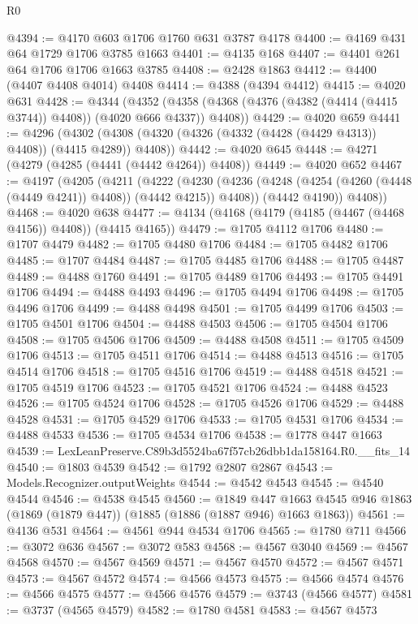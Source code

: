\begin{lexlean}{R0}
\begin{coremodule}
@4394 := @4170 @603 @1706 @1760 @631 @3787 @4178
@4400 := @4169 @431 @64 @1729 @1706 @3785 @1663
@4401 := @4135 @168
@4407 := @4401 @261 @64 @1706 @1706 @1663 @3785
@4408 := @2428 @1863
@4412 := @4400 (@4407 @4408 @4014) @4408
@4414 := @4388 (@4394 @4412)
@4415 := @4020 @631
@4428 := @4344
    (@4352 (@4358 (@4368 (@4376 (@4382 (@4414 (@4415 @3744)) @4408)) (@4020 @666 @4337)) @4408))
@4429 := @4020 @659
@4441 := @4296
    (@4302 (@4308 (@4320 (@4326 (@4332 (@4428 (@4429 @4313)) @4408)) (@4415 @4289)) @4408))
@4442 := @4020 @645
@4448 := @4271 (@4279 (@4285 (@4441 (@4442 @4264)) @4408))
@4449 := @4020 @652
@4467 := @4197
    (@4205
      (@4211
        (@4222
          (@4230 (@4236 (@4248 (@4254 (@4260 (@4448 (@4449 @4241)) @4408)) (@4442 @4215)) @4408))
          (@4442 @4190))
        @4408))
@4468 := @4020 @638
@4477 := @4134 (@4168 (@4179 (@4185 (@4467 (@4468 @4156)) @4408)) (@4415 @4165))
@4479 := @1705 @4112 @1706
@4480 := @1707 @4479
@4482 := @1705 @4480 @1706
@4484 := @1705 @4482 @1706
@4485 := @1707 @4484
@4487 := @1705 @4485 @1706
@4488 := @1705 @4487
@4489 := @4488 @1760
@4491 := @1705 @4489 @1706
@4493 := @1705 @4491 @1706
@4494 := @4488 @4493
@4496 := @1705 @4494 @1706
@4498 := @1705 @4496 @1706
@4499 := @4488 @4498
@4501 := @1705 @4499 @1706
@4503 := @1705 @4501 @1706
@4504 := @4488 @4503
@4506 := @1705 @4504 @1706
@4508 := @1705 @4506 @1706
@4509 := @4488 @4508
@4511 := @1705 @4509 @1706
@4513 := @1705 @4511 @1706
@4514 := @4488 @4513
@4516 := @1705 @4514 @1706
@4518 := @1705 @4516 @1706
@4519 := @4488 @4518
@4521 := @1705 @4519 @1706
@4523 := @1705 @4521 @1706
@4524 := @4488 @4523
@4526 := @1705 @4524 @1706
@4528 := @1705 @4526 @1706
@4529 := @4488 @4528
@4531 := @1705 @4529 @1706
@4533 := @1705 @4531 @1706
@4534 := @4488 @4533
@4536 := @1705 @4534 @1706
@4538 := @1778 @447 @1663
@4539 := LexLeanPreserve.C89b3d5524ba67f57cb26dbb1da158164.R0.__fits_14
@4540 := @1803 @4539
@4542 := @1792 @2807 @2867
@4543 := Models.Recognizer.outputWeights
@4544 := @4542 @4543
@4545 := @4540 @4544
@4546 := @4538 @4545
@4560 := @1849
    @447
    @1663
    @4545
    @946
    @1863
    (@1869 (@1879 @447))
    (@1885 (@1886 (@1887 @946) @1663 @1863))
@4561 := @4136 @531
@4564 := @4561 @944 @4534 @1706
@4565 := @1780 @711
@4566 := @3072 @636
@4567 := @3072 @583
@4568 := @4567 @3040
@4569 := @4567 @4568
@4570 := @4567 @4569
@4571 := @4567 @4570
@4572 := @4567 @4571
@4573 := @4567 @4572
@4574 := @4566 @4573
@4575 := @4566 @4574
@4576 := @4566 @4575
@4577 := @4566 @4576
@4579 := @3743 (@4566 @4577)
@4581 := @3737 (@4565 @4579)
@4582 := @1780 @4581
@4583 := @4567 @4573

\end{coremodule}
\end{lexlean}
